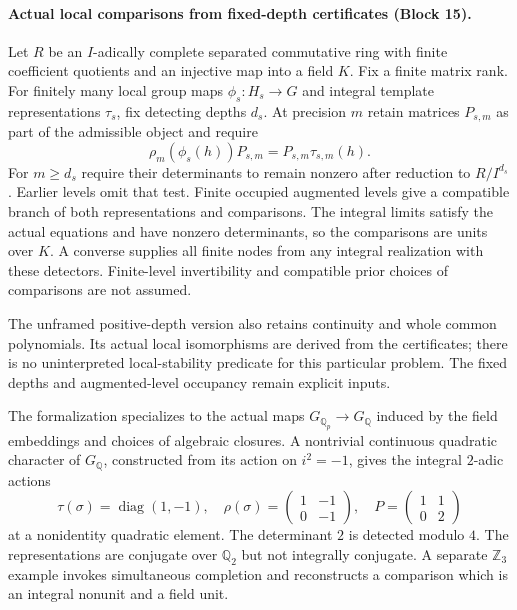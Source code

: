 \documentclass[11pt]{article}
\theoremstyle{definition}
\theoremstyle{remark}
\begin{document}
\paragraph{Actual local comparisons from fixed-depth certificates (Block 15).}
Let $R$ be an $I$-adically complete separated commutative ring with finite
coefficient quotients and an injective map into a field $K$. Fix a finite matrix
rank. For finitely many
local group maps $\phi_s:H_s\to G$ and integral template representations
$\tau_s$, fix detecting depths $d_s$. At precision $m$ retain matrices $P_{s,m}$
as part of the admissible object and require
\[
\rho_m(\phi_s(h))P_{s,m}=P_{s,m}\tau_{s,m}(h).
\]
For $m\ge d_s$ require their determinants to remain nonzero after reduction to
$R/I^{d_s}$. Earlier levels omit that test. Finite occupied augmented levels
give a compatible branch of both representations and comparisons. The integral
limits satisfy the actual equations and have nonzero determinants, so the
comparisons are units over $K$. A converse supplies all finite nodes from any
integral realization with these detectors. Finite-level invertibility and
compatible prior choices of comparisons are not assumed.

The unframed positive-depth version also retains continuity and whole common
polynomials. Its actual local isomorphisms are derived from the certificates;
there is no uninterpreted local-stability predicate for this particular problem.
The fixed depths and augmented-level occupancy remain explicit inputs.

The formalization specializes to the actual maps
$G_{\mathbb Q_p}\to G_{\mathbb Q}$ induced by the field embeddings and choices
of algebraic closures. A nontrivial continuous quadratic character of
$G_{\mathbb Q}$, constructed from its action on $i^2=-1$, gives the integral
$2$-adic actions
\[
\tau(\sigma)=\operatorname{diag}(1,-1),\quad
\rho(\sigma)=\begin{pmatrix}1&-1\\0&-1\end{pmatrix},\quad
P=\begin{pmatrix}1&1\\0&2\end{pmatrix}
\]
at a nonidentity quadratic element. The determinant $2$ is detected modulo $4$.
The representations are conjugate over $\mathbb Q_2$ but not integrally
conjugate. A separate $\mathbb Z_3$ example invokes simultaneous completion
and reconstructs a comparison which is an integral nonunit and a field unit.
\end{document}

